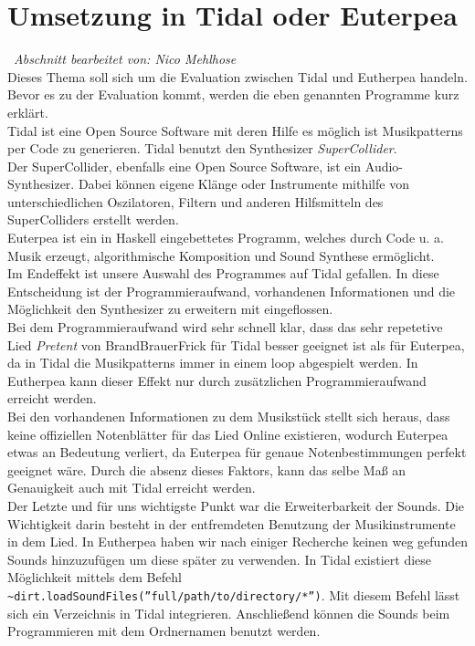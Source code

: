 \documentclass[
10pt, %
a4paper, %
oneside, %
headinclude,footinclude, %
BCOR5mm, %
]{scrartcl}
\begin{document}
\section{Umsetzung in Tidal oder Euterpea}\
\textit{Abschnitt bearbeitet von: Nico Mehlhose}\\

\noindent Dieses Thema soll sich um die Evaluation zwischen Tidal und Eutherpea handeln. Bevor es zu der Evaluation kommt, werden die eben genannten
Programme kurz erklärt.\\
Tidal ist eine Open Source Software mit deren Hilfe es möglich ist Musikpatterns per Code zu generieren. Tidal benutzt den Synthesizer \textit{SuperCollider}.\cite{Tidal}\\
Der SuperCollider, ebenfalls eine Open Source Software, ist ein Audio-Synthesizer. Dabei können eigene Klänge oder Instrumente mithilfe von unterschiedlichen Oszilatoren, Filtern
und anderen Hilfsmitteln des SuperColliders erstellt werden. \cite{SC}\\
Euterpea ist ein in Haskell eingebettetes Programm, welches durch Code u. a. Musik erzeugt, algorithmische Komposition und Sound Synthese ermöglicht.\cite{Euterpea}\\
Im Endeffekt ist unsere Auswahl des Programmes auf Tidal gefallen. In diese Entscheidung ist der Programmieraufwand, vorhandenen Informationen
und die Möglichkeit den Synthesizer zu erweitern mit eingeflossen.\\
Bei dem Programmieraufwand wird sehr schnell klar, dass das sehr repetetive Lied \textit{Pretent} von BrandBrauerFrick für Tidal besser geeignet ist als für Euterpea, da in Tidal die Musikpatterns immer in einem loop abgespielt werden. In Eutherpea kann dieser Effekt nur durch zusätzlichen Programmieraufwand erreicht werden.\\ 
Bei den vorhandenen Informationen zu dem Musikstück stellt sich heraus, dass keine offiziellen Notenblätter für das Lied Online existieren, wodurch Euterpea etwas an Bedeutung verliert, da Euterpea für genaue Notenbestimmungen perfekt geeignet wäre. Durch die absenz dieses Faktors, kann das selbe Maß an Genauigkeit auch mit Tidal erreicht werden.\\
Der Letzte und für uns wichtigste Punkt war die Erweiterbarkeit der Sounds. Die Wichtigkeit darin besteht in der entfremdeten Benutzung der Musikinstrumente in dem Lied.
In Eutherpea haben wir nach einiger Recherche keinen weg gefunden Sounds hinzuzufügen um diese später zu verwenden. In Tidal existiert diese Möglichkeit mittels
dem Befehl \verb|~dirt.loadSoundFiles(”full/path/to/directory/*”)|. Mit diesem Befehl lässt sich ein Verzeichnis in Tidal integrieren. Anschließend können die Sounds beim Programmieren mit dem Ordnernamen benutzt werden.\cite{tidcy}
\end{document}
